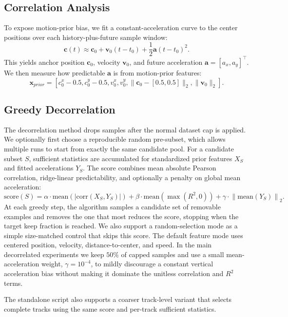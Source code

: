 \subsection{Correlation Analysis}

To expose motion-prior bias, we fit a constant-acceleration curve to the center positions over each history-plus-future sample window:
\begin{equation}
  \mathbf{c}(t) \approx \mathbf{c}_0 + \mathbf{v}_0(t-t_0)
  + \frac{1}{2}\mathbf{a}(t-t_0)^2.
\end{equation}
This yields anchor position $\mathbf{c}_0$, velocity $\mathbf{v}_0$, and future acceleration $\mathbf{a}=[a_x,a_y]^\top$. We then measure how predictable $\mathbf{a}$ is from motion-prior features:
\begin{equation}
  \mathbf{x}_{prior} =
  [c^x_0-0.5, c^y_0-0.5, v^x_0, v^y_0,
   \|\mathbf{c}_0-[0.5,0.5]\|_2, \|\mathbf{v}_0\|_2].
\end{equation}

\subsection{Greedy Decorrelation}

The decorrelation method drops samples after the normal dataset cap is applied. We optionally first choose a reproducible random pre-subset, which allows multiple runs to start from exactly the same candidate pool. For a candidate subset $S$, sufficient statistics are accumulated for standardized prior features $X_S$ and fitted accelerations $Y_S$. The score combines mean absolute Pearson correlation, ridge-linear predictability, and optionally a penalty on global mean acceleration:
\begin{equation}
  \mathrm{score}(S) =
  \alpha \cdot \mathrm{mean}\left(|\mathrm{corr}(X_S,Y_S)|\right)
  + \beta \cdot \mathrm{mean}\left(\max(R^2,0)\right)
  + \gamma \cdot \left\|\mathrm{mean}(Y_S)\right\|_2.
\end{equation}
At each greedy step, the algorithm samples a candidate set of removable examples and removes the one that most reduces the score, stopping when the target keep fraction is reached. We also support a random-selection mode as a simple size-matched control that skips this score. The default feature mode uses centered position, velocity, distance-to-center, and speed. In the main decorrelated experiments we keep $50\%$ of capped samples and use a small mean-acceleration weight, $\gamma=10^{-4}$, to mildly discourage a constant vertical acceleration bias without making it dominate the unitless correlation and $R^2$ terms.

The standalone script also supports a coarser track-level variant that selects complete tracks using the same score and per-track sufficient statistics.
